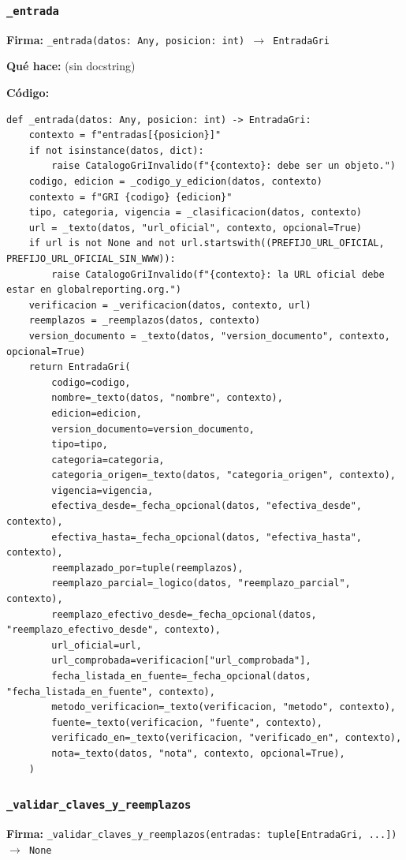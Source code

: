 \documentclass[11pt,a4paper]{article}
\begin{document}
\subsubsection*{\texttt{\_entrada}}
\textbf{Firma:} \texttt{\_entrada(datos: Any, posicion: int) $\rightarrow$ EntradaGri}

\textbf{Qué hace:} (sin docstring)

\textbf{Código:}
\begin{lstlisting}
def _entrada(datos: Any, posicion: int) -> EntradaGri:
    contexto = f"entradas[{posicion}]"
    if not isinstance(datos, dict):
        raise CatalogoGriInvalido(f"{contexto}: debe ser un objeto.")
    codigo, edicion = _codigo_y_edicion(datos, contexto)
    contexto = f"GRI {codigo} {edicion}"
    tipo, categoria, vigencia = _clasificacion(datos, contexto)
    url = _texto(datos, "url_oficial", contexto, opcional=True)
    if url is not None and not url.startswith((PREFIJO_URL_OFICIAL, PREFIJO_URL_OFICIAL_SIN_WWW)):
        raise CatalogoGriInvalido(f"{contexto}: la URL oficial debe estar en globalreporting.org.")
    verificacion = _verificacion(datos, contexto, url)
    reemplazos = _reemplazos(datos, contexto)
    version_documento = _texto(datos, "version_documento", contexto, opcional=True)
    return EntradaGri(
        codigo=codigo,
        nombre=_texto(datos, "nombre", contexto),
        edicion=edicion,
        version_documento=version_documento,
        tipo=tipo,
        categoria=categoria,
        categoria_origen=_texto(datos, "categoria_origen", contexto),
        vigencia=vigencia,
        efectiva_desde=_fecha_opcional(datos, "efectiva_desde", contexto),
        efectiva_hasta=_fecha_opcional(datos, "efectiva_hasta", contexto),
        reemplazado_por=tuple(reemplazos),
        reemplazo_parcial=_logico(datos, "reemplazo_parcial", contexto),
        reemplazo_efectivo_desde=_fecha_opcional(datos, "reemplazo_efectivo_desde", contexto),
        url_oficial=url,
        url_comprobada=verificacion["url_comprobada"],
        fecha_listada_en_fuente=_fecha_opcional(datos, "fecha_listada_en_fuente", contexto),
        metodo_verificacion=_texto(verificacion, "metodo", contexto),
        fuente=_texto(verificacion, "fuente", contexto),
        verificado_en=_texto(verificacion, "verificado_en", contexto),
        nota=_texto(datos, "nota", contexto, opcional=True),
    )
\end{lstlisting}

\subsubsection*{\texttt{\_validar\_claves\_y\_reemplazos}}
\textbf{Firma:} \texttt{\_validar\_claves\_y\_reemplazos(entradas: tuple[EntradaGri, ...]) $\rightarrow$ None}
\end{document}
